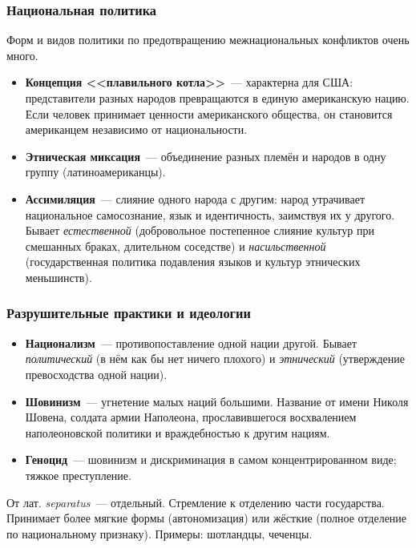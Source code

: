 \documentclass[12pt]{article}
\begin{document}
	\subsubsection{Национальная политика}

	Форм и видов политики по предотвращению межнациональных конфликтов очень много.

	\begin{itemize}
		\item \textbf{Концепция <<плавильного котла>>}~--- характерна для США: представители разных народов превращаются в единую американскую нацию. Если человек принимает ценности американского общества, он становится американцем независимо от национальности.
		\item \textbf{Этническая миксация}~--- объединение разных племён и народов в одну группу (латиноамериканцы).
		\item \textbf{Ассимиляция}~--- слияние одного народа с другим: народ утрачивает национальное самосознание, язык и идентичность, заимствуя их у другого. Бывает \textit{естественной} (добровольное постепенное слияние культур при смешанных браках, длительном соседстве) и \textit{насильственной} (государственная политика подавления языков и культур этнических меньшинств).
	\end{itemize}

	\subsubsection{Разрушительные практики и идеологии}

	\begin{itemize}
		\item \textbf{Национализм}~--- противопоставление одной нации другой. Бывает \textit{политический} (в нём как бы нет ничего плохого) и \textit{этнический} (утверждение превосходства одной нации).
		\item \textbf{Шовинизм}~--- угнетение малых наций большими. Название от имени Николя Шовена, солдата армии Наполеона, прославившегося восхвалением наполеоновской политики и враждебностью к другим нациям.
		\item \textbf{Геноцид}~--- шовинизм и дискриминация в самом концентрированном виде; тяжкое преступление.
	\end{itemize}

	\begin{definition}[Сепаратизм]
		От лат. \textit{separatus}~--- отдельный. Стремление к отделению части государства. Принимает более мягкие формы (автономизация) или жёсткие (полное отделение по национальному признаку). Примеры: шотландцы, чеченцы.
	\end{definition}
\end{document}
